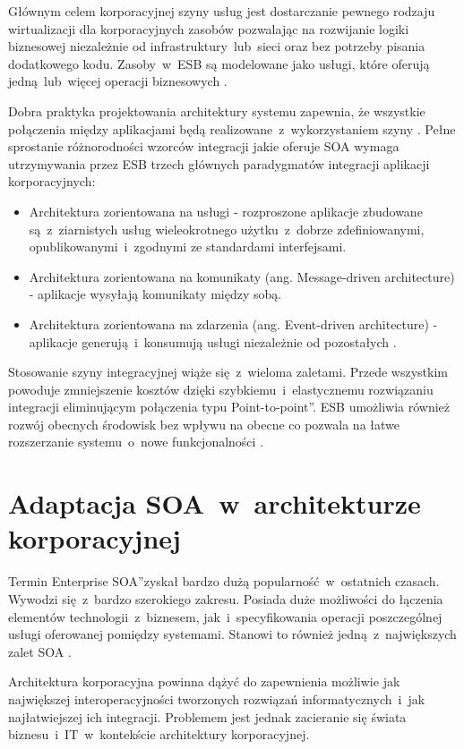 Głównym celem korporacyjnej szyny usług jest dostarczanie pewnego rodzaju wirtualizacji dla korporacyjnych zasobów pozwalając na rozwijanie logiki biznesowej niezależnie od infrastruktury~lub~sieci oraz bez potrzeby pisania dodatkowego kodu. Zasoby~w~ESB są modelowane jako usługi, które oferują jedną~lub~więcej operacji biznesowych \cite{IBMRBSoaPat}.

Dobra praktyka projektowania architektury systemu zapewnia, że wszystkie połączenia między aplikacjami będą realizowane~z~wykorzystaniem szyny \cite{PlatIntGor}. Pełne sprostanie różnorodności wzorców integracji jakie oferuje SOA wymaga utrzymywania przez ESB trzech głównych paradygmatów integracji aplikacji korporacyjnych:
\begin{itemize}
\item{Architektura zorientowana na usługi - rozproszone aplikacje zbudowane są~z~ziarnistych usług wieleokrotnego użytku~z~dobrze zdefiniowanymi, opublikowanymi~i~zgodnymi ze standardami interfejsami.}
\item{Architektura zorientowana na komunikaty (ang. Message-driven architecture) - aplikacje wysyłają komunikaty między sobą.}
\item{Architektura zorientowana na zdarzenia (ang. Event-driven architecture) - aplikacje generują~i~konsumują usługi niezależnie od pozostałych \cite{IBMRBSoaPat}.} 
\end{itemize}

Stosowanie szyny integracyjnej wiąże się~z~wieloma zaletami. Przede wszystkim powoduje zmniejszenie kosztów dzięki szybkiemu~i~elastycznemu rozwiązaniu integracji eliminującym połączenia typu \quotedblbase Point-to-point\textquotedblright. ESB umożliwia również rozwój obecnych środowisk bez wpływu na obecne co pozwala na łatwe rozszerzanie systemu~o~nowe funkcjonalności \cite{IBMRBSoaPat}.

\section{Adaptacja SOA~w~architekturze korporacyjnej}
Termin \quotedblbase Enterprise SOA\textquotedblright zyskał bardzo dużą popularność~w~ostatnich czasach. Wywodzi się~z~bardzo szerokiego zakresu. Posiada duże możliwości do łączenia elementów technologii~z~biznesem, jak~i~specyfikowania operacji poszczególnej usługi oferowanej pomiędzy systemami. Stanowi to również jedną~z~największych zalet SOA \cite{EntSOACoryCanSoaML}. 

Architektura korporacyjna powinna dążyć do zapewnienia możliwie jak największej interoperacyjności tworzonych rozwiązań informatycznych~i~jak najłatwiejszej ich integracji. Problemem jest jednak zacieranie się świata biznesu~i~IT~w~kontekście architektury korporacyjnej.

